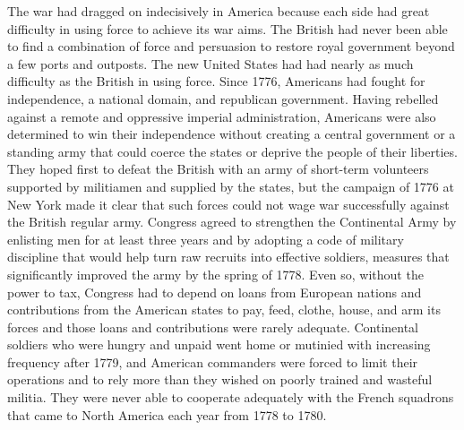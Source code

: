 The war had dragged on indecisively in America because each side had great
difficulty in using force to achieve its war aims. The British had never been
able to find a combination of force and persuasion to restore royal government
beyond a few ports and outposts. The new United States had had nearly as much
difficulty as the British in using force. Since 1776, Americans had fought for
independence, a national domain, and republican government.  Having rebelled
against a remote and oppressive imperial administration, Americans were also
determined to win their independence without creating a central government or a
standing army that could coerce the states or deprive the people of their
liberties.  They hoped first to defeat the British with an army of short-term
volunteers supported by militiamen and supplied by the states, but the campaign
of 1776 at New York made it clear that such forces could not wage war
successfully against the British regular army. Congress agreed to strengthen
the Continental Army by enlisting men for at least three years and by adopting
a code of military discipline that would help turn raw recruits into effective
soldiers, measures that significantly improved the army by the spring of 1778. Even so,
without the power to tax, Congress had to depend on loans from European nations and
contributions from the American states to pay, feed, clothe, house, and arm its forces and
those loans and contributions were rarely adequate. Continental soldiers who were hungry
and unpaid went home or mutinied with increasing frequency after 1779, and American
commanders were forced to limit their operations and to rely more than they wished on
poorly trained and wasteful militia. They were never able to cooperate adequately with the
French squadrons that came to North America each year from 1778 to 1780.

